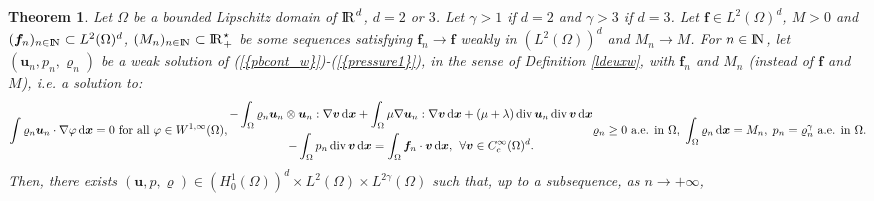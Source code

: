\documentclass{amsart}
\newtheorem{thm}{Theorem}
\numberwithin{equation}{section}
\begin{document}
\begin{thm}\label{continuityws}
Let $ \Omega $ be a bounded Lipschitz domain of $ {\ifmmode{\rm	I\mkern-3.1mu
R\mkern1mu}\else{\rm I\kern-.18em 
R\hskip1pt\	}\fi\relax}^d$, $d=2$ or $3$. Let $\gamma >1 $ if $d=2$ and $\gamma > 3$ if $d=3$. Let $\bm{f} \in L^2(\Omega)^d$, $M >0$ and $(\bm{f}_n)_{{n \in {\ifmmode{\rm	I\mkern-3.1mu
N\mkern0.5mu}\else{\rm I\kern-.16em
N\hskip0.5pt\ }\fi\relax}}} \subset L^2(\Omega)^d$, $(M_n)_{{n \in {\ifmmode{\rm	I\mkern-3.1mu
N\mkern0.5mu}\else{\rm I\kern-.16em
N\hskip0.5pt\ }\fi\relax}}} \subset {\ifmmode{\rm	I\mkern-3.1mu
R\mkern1mu}\else{\rm I\kern-.18em 
R\hskip1pt\	}\fi\relax}_+^\star$ be some sequences satisfying
$\bm{f}_n {\rightarrow} \bm{f}$ weakly in $(L^2(\Omega))^d$ and $M_n {\rightarrow} M$. For ${{n \in {\ifmmode{\rm	I\mkern-3.1mu
N\mkern0.5mu}\else{\rm I\kern-.16em
N\hskip0.5pt\ }\fi\relax}}}$, let $({{\boldsymbol u}}_n,p_n,{\varrho}_n)$ be a weak solution of
{(\ref{{pbcont_w}})}-{(\ref{{pressure1}})}, in the sense of Definition \ref{ldeuxw}, with $\bm{f}_n$ and $M_n$ (instead of $\bm{f}$ and $M$), i.e. a solution to: 
\begin{subequations}
\begin{equation}\int {\varrho}_n {{\boldsymbol u}}_n \cdot {{\nabla}} \varphi{\, {\rm d}{{\boldsymbol x}}} = 0 \textrm{ for all } \varphi \in W^{1,\infty}(\Omega),
\label{eq:massn} \end{equation}  
\begin{multline}\label{eq:qdmn}
	- \int_\Omega {\varrho}_n {\bm{u}}_n \otimes {\bm{u}}_n : \nabla {\bm{v}} {\, {\rm d}{{\boldsymbol x}}} +\int_\Omega \mu\nabla {\bm{u}}_n : \nabla {\bm{v}} {\, {\rm d}{{\boldsymbol x}}} +(\mu +\lambda) \operatorname{div} {\bm{u}}_n  \operatorname{div} {\bm{v}} {\, {\rm d}{{\boldsymbol x}}} \\
 -\int_\Omega p_n \operatorname{div} {\bm{v}} {\, {\rm d}{{\boldsymbol x}}} = \int_\Omega \bm{f}_n \cdot {\bm{v}} {\, {\rm d}{{\boldsymbol x}}}, \;  \, \forall {\bm{v}} \in C_c^\infty(\Omega)^d.
\end{multline}
\label{eq:nsn} 
\begin{equation} {\varrho}_n \ge 0  \textrm{ a.e.  in } \Omega, \; \int_\Omega {\varrho}_n {\, {\rm d}{{\boldsymbol x}}} = M_n, \;  p_n= {\varrho}_n^\gamma \textrm{ a.e.  in } \Omega.
 \label{eq:poseosn}
\end{equation}\label{eq:weakn}\end{subequations}
Then, there exists $({{\boldsymbol u}},p,{\varrho}) \in (H^1_0(\Omega))^d \times L^2(\Omega) \times L^{2\gamma}(\Omega)$ such that, up to a subsequence, as ${{n {\rightarrow} + \infty}}$,

\end{thm}
\end{document}
